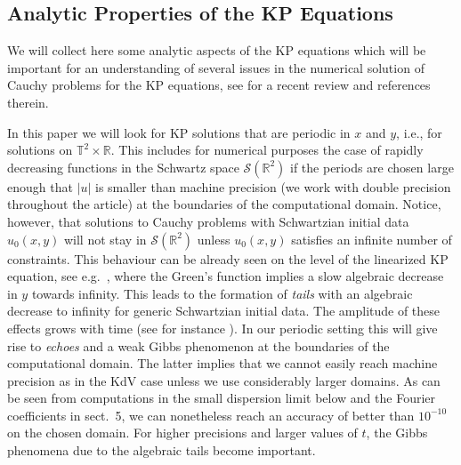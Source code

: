 \documentclass[final]{siamltex}
\begin{document}
\subsection{Analytic Properties of the KP Equations}
We will collect here some analytic aspects of the KP equations which 
will be important for an understanding of several issues in the 
numerical solution of Cauchy problems for the KP equations, see 
\cite{KS10} for a recent review and references therein. 

In this paper we will look for KP solutions that are periodic in $x$ 
and $y$, i.e., for solutions on $\mathbb{T}^{2}\times \mathbb{R}$. 
This includes for numerical purposes the case of rapidly decreasing 
functions in the Schwartz space $\mathcal{S}(\mathbb{R}^{2})$ if the 
periods are chosen large enough that $|u|$ is smaller than machine 
precision (we work with double precision throughout the article) at 
the boundaries of the computational domain. 
Notice, however, that solutions to Cauchy problems with Schwartzian 
initial data $u_{0}(x,y)$ will not stay in 
$\mathcal{S}(\mathbb{R}^{2})$ unless $u_{0}(x,y)$ satisfies an 
infinite number of constraints. This behaviour can be already seen on 
the level of the linearized KP equation, see e.g.~\cite{BPP,KSM}, where 
the Green's function implies a slow algebraic decrease in $y$ towards 
infinity. This leads to the formation of \emph{tails} with an 
algebraic decrease to infinity for generic Schwartzian initial data. 
The amplitude of these effects grows with time (see for instance \cite{KSM}).
In our periodic setting this will give rise to \emph{echoes} and a weak Gibbs phenomenon at 
the boundaries of the computational domain. The latter implies that 
we cannot easily reach machine precision as in the KdV case unless we 
use considerably larger domains. As can be seen from computations in 
the small dispersion limit below and the Fourier coefficients in 
sect.~5, we can nonetheless reach an 
accuracy of better than $10^{-10}$ on the chosen domain. For higher 
precisions  and larger values of $t$,  the 
Gibbs phenomena due to the algebraic tails become important.
\end{document}
